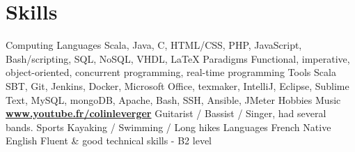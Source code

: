 \documentclass[]{friggeri-cv}
\begin{document}
\section{Skills}
\begin{entrylist}
  \entry
    {Computing}
    {Languages}
    {}
    {Scala, Java, C, HTML/CSS, PHP, JavaScript, Bash/scripting, SQL, NoSQL, VHDL, \LaTeX}
  \entry
    {}
    {Paradigms}
    {}
    {Functional, imperative, object-oriented, concurrent programming, real-time programming}
  \entry
    {}
    {Tools}
    {}
    {Scala SBT, Git, Jenkins, Docker, Microsoft Office, texmaker, IntelliJ, Eclipse, Sublime Text, MySQL, mongoDB, Apache, Bash, SSH, Ansible, JMeter}
  \entry
    {Hobbies}
    {Music}
    {\href{https://www.youtube.com/channel/UCPBCzj-0apmax9lFwj3qKhA}{\textbf{www.youtube.fr/colinleverger}}}
    {Guitarist / Bassist / Singer, had several bands.}
  \entry
    {}
    {Sports}
    {}
    {Kayaking / Swimming / Long hikes}
  \entry
    {Languages}
    {French}
    {}
    {Native}
  \entry
    {}
    {English}
    {}
    {Fluent \& good technical skills - B2 level}
\end{entrylist}
\end{document}
